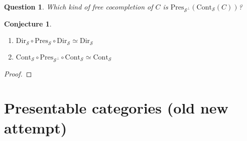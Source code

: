 \documentclass{article}
\newcommand{\Cont}[1]{\text{Cont}_{#1}}
\newcommand{\Dir}[1]{\text{Dir}_{#1}}
\newcommand{\Pres}[1]{\text{Pres}_{#1}}
\newcommand{\Set}{\text{Set}}
\newtheorem{conjecture}[theorem]{Conjecture}
\newtheorem{question}[theorem]{Question}
\begin{document}
  \begin{question}
    Which kind of free cocompletion of $C$ is
    $\Pres{\mathcal{S}^\bot}(\Cont{\mathcal{S}}(C))$?
  \end{question}
  \begin{conjecture}
    \begin{enumerate}
    \item 
      $\Dir{\mathcal{S}} \circ \Pres{\mathcal{S}} \circ \Dir{\mathcal{S}} \simeq \Dir{\mathcal{S}} $
      \item
      $\Cont{\mathcal{S}} \circ \Pres{\mathcal{S}^\bot} \circ \Cont{\mathcal{S}} \simeq \Cont{\mathcal{S}} $
    \end{enumerate}
  \end{conjecture}
  \begin{proof}
  \end{proof}
\section{Presentable categories (old new attempt)}
\end{document}

